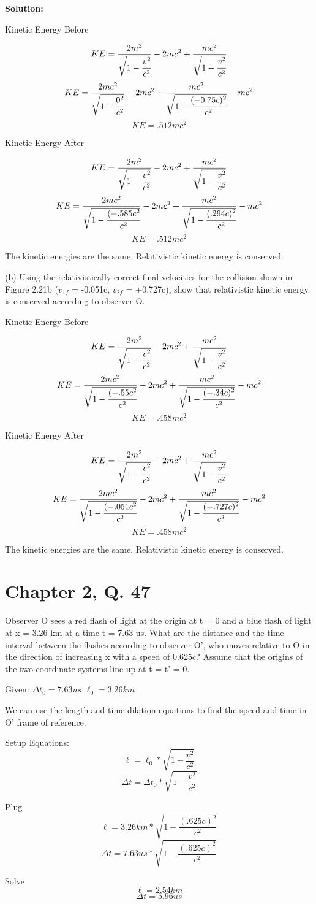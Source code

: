 \documentclass{article}
\begin{document}
\textbf{Solution:}

Kinetic Energy Before

$$ KE = \frac{2m^2}{\sqrt{1 - \cfrac{v^2}{c^2}}} - 2mc^2 + \frac{mc^2}{\sqrt{1 - \cfrac{v^2}{c^2}}}$$
$$ KE = \frac{2mc^2}{\sqrt{1 - \cfrac{0^2}{c^2}}} - 2mc^2 + \frac{mc^2}{\sqrt{1 - \cfrac{(-0.75c)^2}{c^2}}} - mc^2$$
$$ KE =  .512 mc^2 $$

Kinetic Energy After

$$ KE = \frac{2m^2}{\sqrt{1 - \cfrac{v^2}{c^2}}} - 2mc^2 + \frac{mc^2}{\sqrt{1 - \cfrac{v^2}{c^2}}}$$
$$ KE = \frac{2mc^2}{\sqrt{1 - \cfrac{(-.585c^2}{c^2}}} - 2mc^2 + \frac{mc^2}{\sqrt{1 - \cfrac{(.294c)^2}{c^2}}} - mc^2$$
$$ KE =  .512 mc^2 $$

The kinetic energies are the same. Relativistic kinetic energy is conserved.



(b) Using the relativistically correct final velocities for the collision shown in Figure 2.21b ($v_{1f}$ = -0.051c, $v_{2f}$ = +0.727c), show that relativistic kinetic energy is conserved according to observer O.

Kinetic Energy Before

$$ KE = \frac{2m^2}{\sqrt{1 - \cfrac{v^2}{c^2}}} - 2mc^2 + \frac{mc^2}{\sqrt{1 - \cfrac{v^2}{c^2}}}$$
$$ KE = \frac{2mc^2}{\sqrt{1 - \cfrac{(-.55c^2}{c^2}}} - 2mc^2 + \frac{mc^2}{\sqrt{1 - \cfrac{(-.34c)^2}{c^2}}} - mc^2$$
$$ KE =  .458 mc^2 $$

Kinetic Energy After

$$ KE = \frac{2m^2}{\sqrt{1 - \cfrac{v^2}{c^2}}} - 2mc^2 + \frac{mc^2}{\sqrt{1 - \cfrac{v^2}{c^2}}}$$
$$ KE = \frac{2mc^2}{\sqrt{1 - \cfrac{(-.051c^2}{c^2}}} - 2mc^2 + \frac{mc^2}{\sqrt{1 - \cfrac{(-.727c)^2}{c^2}}} - mc^2$$
$$ KE =  .458 mc^2 $$

The kinetic energies are the same. Relativistic kinetic energy is conserved.


\section*{Chapter 2, Q. 47}
Observer O sees a red flash of light at the origin at t = 0 and a blue flash of light at x = 3.26 km at a time t = 7.63 us. What are the distance and the time interval between the flashes according to observer O', who moves relative to O in the direction of increasing x with a speed of 0.625c?  Assume that the origins of the two coordinate systems line up at t = t' = 0.


Given:
$ \Delta t_0 = 7.63us $ $ \ell_0= 3.26km $

We can use the length and time dilation equations to find the speed and time in O' frame of reference.

Setup Equations:
	$$\ell = \ell_0 * \sqrt{1 - \frac{v^2}{c^2}}$$
	$$\Delta t = \Delta t_0 * \sqrt{1 - \frac{v^2}{c^2}}$$

Plug
	$$\ell = 3.26 km * \sqrt{1 - \frac{(.625c)^2}{c^2}}$$
	$$\Delta t = 7.63 us * \sqrt{1 - \frac{(.625c)^2}{c^2}}$$

Solve
	$$\ell = 2.54km$$
	$$\Delta t = 5.96 us $$
\end{document}
